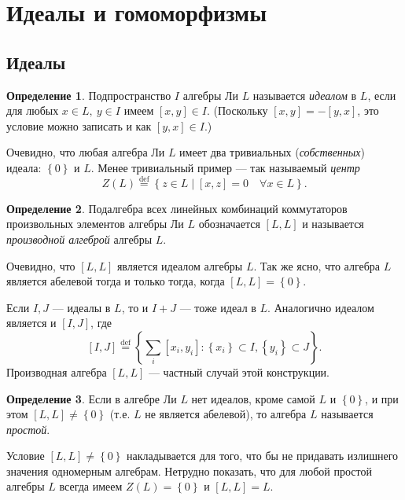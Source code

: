 \documentclass[a4paper, 12pt]{article}
\theoremstyle{definition}
\newtheorem{definition}{Определение}[section]
\begin{document}
\section{Идеалы и гомоморфизмы}
\subsection{Идеалы}

\begin{definition}
    Подпространство \({ I }\) алгебры Ли \({ L }\) называется \textit{идеалом} в \({ L }\), если для любых \({ x \in L,\: y \in I }\) имеем \({ [x, y] \in I }\). (Поскольку \({ [x, y] = -[y, x] }\), это условие можно записать и как \({ [y, x] \in I }\).)
\end{definition}

Очевидно, что любая алгебра Ли \({ L }\) имеет два тривиальных (\textit{собственных}) идеала: \({ \left\{ 0 \right\} }\) и \({ L }\). Менее тривиальный пример --- так называемый \textit{центр}
\[
    Z(L) \overset{\text{def}}= \left\{ z \in L \mid [x, z] = 0 \quad \forall x \in L \right\}.
\]

\begin{definition}
    Подалгебра всех линейных комбинаций коммутаторов произвольных элементов алгебры Ли \({ L }\) обозначается \({ [L, L] }\) и называется \textit{производной алгеброй} алгебры \({ L }\).
\end{definition}

Очевидно, что \({ [L, L] }\) является идеалом алгебры \({ L }\). Так же ясно, что алгебра \({ L }\) является абелевой тогда и только тогда, когда \({ [L, L] = \left\{ 0 \right\} }\).

Если \({ I, J }\) --- идеалы в \({ L }\), то и \({ I + J }\) --- тоже идеал в \({ L }\). Аналогично идеалом является и \({ [I, J] }\), где
\[
    [I, J] \overset{\text{def}}= \left\{ \sum_i [x_i, y_i] : \left\{ x_i \right\} \subset I, \left\{ y_i \right\} \subset J \right\}.
\]
Производная алгебра \({ [L, L] }\) --- частный случай этой конструкции.

\begin{definition}
    Если в алгебре Ли \({ L }\) нет идеалов, кроме самой \({ L }\) и \({ \left\{ 0 \right\} }\), и при этом \({ [L, L] \neq \left\{ 0 \right\} }\) (т.е. \({ L }\) не является абелевой), то алгебра \({ L }\) называется \textit{простой}.
\end{definition}

Условие \({ [L, L] \neq \left\{ 0 \right\} }\) накладывается для того, что бы не придавать излишнего значения одномерным алгебрам. Нетрудно показать, что для любой простой алгебры \({ L }\) всегда имеем \({ Z(L) = \left\{ 0 \right\} }\) и \({ [L, L] = L }\).
\end{document}
